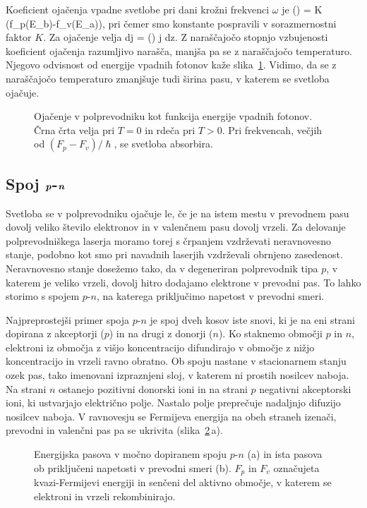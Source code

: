 Koeficient ojačenja vpadne svetlobe pri dani krožni
frekvenci $\omega$ je
\beq
\gamma(\omega) = K \left(f_p(E_b)-f_v(E_a)\right)\!,
\label{eq:gainSC}
\eeq
pri čemer smo konstante pospravili v sorazmernostni faktor $K$. Za ojačenje velja
\beq
dj = \gamma(\omega) j dz.
\eeq
Z naraščajočo stopnjo vzbujenosti 
koeficient ojačenja razumljivo narašča, manjša pa se z naraščajočo 
temperaturo. Njegovo odvisnost od energije vpadnih fotonov kaže slika~\ref{s6.11}. Vidimo,
da se z naraščajočo temperaturo zmanjšuje tudi širina pasu, v katerem se svetloba ojačuje.
\begin{figure}[ht]
\centering
\def\svgwidth{80truemm} 

\caption{Ojačenje v polprevodniku kot funkcija energije vpadnih fotonov. Črna črta
velja pri $T=0$ in rdeča pri $T>0$. Pri frekvencah, večjih od $(F_p-F_v)/\hslash$,
se svetloba absorbira. 
}
\label{s6.11}
\end{figure}

\subsection*{Spoj $\textbf{\textit{p}}$-$\textbf{\textit{n}}$}
Svetloba se v polprevodniku ojačuje le, če je na istem mestu v prevodnem pasu
dovolj veliko število elektronov in v valenčnem pasu dovolj vrzeli. Za delovanje
polprevodniškega laserja moramo torej s črpanjem vzdrževati neravnovesno stanje, 
podobno kot smo pri navadnih laserjih vzdrževali obrnjeno zasedenost. 
Neravnovesno stanje dosežemo tako, da v degeneriran pol\-pre\-vod\-nik tipa $p$, v
katerem je veliko vrzeli, dovolj hitro dodajamo elektrone v prevodni pas. To lahko storimo s spojem
$p$-$n$, na katerega priključimo napetost v prevodni smeri. 

Najpreprostejši primer spoja $p$-$n$ je spoj dveh kosov iste snovi, ki je
na eni strani dopirana z akceptorji ($p$) in na drugi z donorji ($n$). 
Ko staknemo območji $p$ in $n$, elektroni iz območja z višjo koncentracijo 
difundirajo v območje z nižjo koncentracijo in vrzeli ravno obratno. 
Ob spoju nastane v stacionarnem stanju ozek pas, tako imenovani izpraznjeni sloj, 
v katerem ni prostih nosilcev naboja. Na strani $n$ ostanejo pozitivni donorski ioni in 
na strani $p$ negativni akceptorski ioni, ki ustvarjajo električno polje. 
Nastalo polje preprečuje nadaljnjo difuzijo nosilcev naboja. 
V ravnovesju se Fermijeva energija na obeh straneh izenači, 
prevodni in valenčni pas pa se ukrivita (slika~\ref{fig:pnlaser}\,a).
\begin{figure}[ht]
\centering
\def\svgwidth{150truemm} 

\caption{Energijska pasova v močno dopiranem spoju $p$-$n$ (a) in 
ista pasova ob priključeni napetosti v prevodni smeri (b). $F_p$ in $F_v$
označujeta kvazi-Fermijevi energiji in senčeni del aktivno območje, 
v katerem se elektroni in vrzeli rekombinirajo.
}
\label{fig:pnlaser}
\end{figure}


